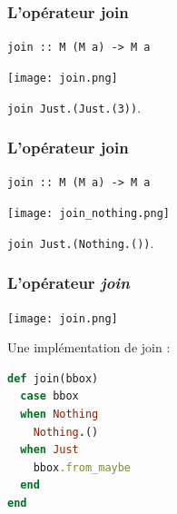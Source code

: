 \documentclass{beamer}
\begin{document}
\begin{frame}
\frametitle{L'opérateur join}
\begin{block}{}
\begin{center}
\verb!join :: M (M a) -> M a!
\end{center}
\end{block}

\begin{center}
\texttt{[image: join.png]}
\end{center}
\pause
\begin{exampleblock}{}
\begin{center}
\verb!join Just.(Just.(3))!.
\end{center}
\end{exampleblock}
\end{frame}


\begin{frame}
\frametitle{L'opérateur join}
\begin{block}{}
\begin{center}
\verb!join :: M (M a) -> M a!
\end{center}
\end{block}
\medskip
\begin{center}
\texttt{[image: join\_nothing.png]}
\end{center}
\medskip
\pause
\begin{exampleblock}{}
\begin{center}
\verb!join Just.(Nothing.())!.
\end{center}
\end{exampleblock}
\end{frame}



\begin{frame}[fragile]
\frametitle{L'opérateur \emph{join}}
\begin{center}
\texttt{[image: join.png]}
\end{center}
\begin{block}{Une implémentation de join :}
\begin{lstlisting}[language=ruby]
def join(bbox)
  case bbox
  when Nothing
    Nothing.()
  when Just
    bbox.from_maybe
  end
end
\end{lstlisting}
\end{block}
\end{frame}
\end{document}
